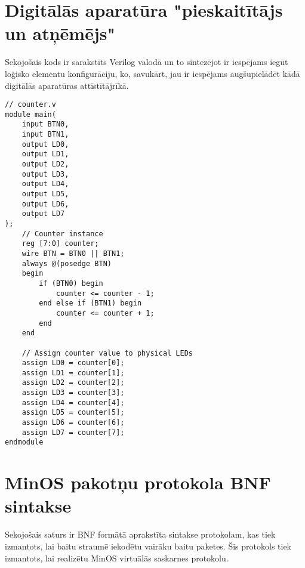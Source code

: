 \renewcommand{\thesection}{\arabic{section}}
\titleformat{\section}{\normalfont\large\bfseries}{\thesection. Pielikums.}{1em}{}

\section{Digitālās aparatūra "pieskaitītājs un atņēmējs"}
\label{att:counter}

Sekojošais kods ir sarakstīts Verilog valodā un to sintezējot ir iespējams iegūt
loģisko elementu konfigurāciju, ko, savukārt, jau ir iespējams augšupielādēt
kādā digitālās aparatūras attīstītājrīkā.

\begin{lstlisting}
// counter.v
module main(
    input BTN0,
    input BTN1,
    output LD0,
    output LD1,
    output LD2,
    output LD3,
    output LD4,
    output LD5,
    output LD6,
    output LD7
);
    // Counter instance
    reg [7:0] counter;
    wire BTN = BTN0 || BTN1;
    always @(posedge BTN)
    begin
        if (BTN0) begin
            counter <= counter - 1;
        end else if (BTN1) begin
            counter <= counter + 1;
        end
    end

    // Assign counter value to physical LEDs
    assign LD0 = counter[0];
    assign LD1 = counter[1];
    assign LD2 = counter[2];
    assign LD3 = counter[3];
    assign LD4 = counter[4];
    assign LD5 = counter[5];
    assign LD6 = counter[6];
    assign LD7 = counter[7];
endmodule    
\end{lstlisting}
  
\section{MinOS pakotņu protokola BNF sintakse}
\label{att:minosbnf}

Sekojošais saturs ir BNF formātā aprakstīta sintakse protokolam, kas tiek
izmantots, lai baitu straumē iekodētu vairāku baitu paketes. Šis protokols tiek
izmantots, lai realizētu MinOS virtuālās saskarnes protokolu.

